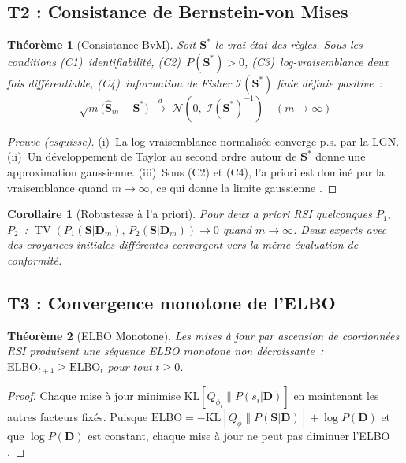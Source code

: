 \documentclass[letterpaper]{article}
\newtheorem{theoreme}{Th\'eor\`eme}
\newtheorem{corollaire}{Corollaire}[theoreme]
\begin{document}
\subsection{T2 : Consistance de Bernstein-von Mises}

\begin{theoreme}[Consistance BvM]
\label{thm:bvm}
Soit $\mathbf{S}^*$ le vrai \'etat des r\`egles. Sous les conditions
(C1)~identifiabilit\'e, (C2)~$P(\mathbf{S}^*) > 0$,
(C3)~log-vraisemblance deux fois diff\'erentiable,
(C4)~information de Fisher $\mathcal{I}(\mathbf{S}^*)$ finie d\'efinie positive~:
\[
  \sqrt{m}\bigl(\hat{\mathbf{S}}_m - \mathbf{S}^*\bigr)
  \;\xrightarrow{d}\;
  \mathcal{N}\!\left(0,\;\mathcal{I}(\mathbf{S}^*)^{-1}\right)
  \quad (m \to \infty)
\]
\end{theoreme}

\begin{proof}[Preuve (esquisse)]
(i)~La log-vraisemblance normalis\'ee converge p.s. par la LGN.
(ii)~Un d\'eveloppement de Taylor au second ordre autour de $\mathbf{S}^*$
donne une approximation gaussienne.
(iii)~Sous (C2) et (C4), l'a priori est domin\'e par la vraisemblance
quand $m \to \infty$, ce qui donne la limite gaussienne
\citep{van2000asymptotic}.
\end{proof}

\begin{corollaire}[Robustesse \`a l'a priori]
Pour deux a priori RSI quelconques $P_1$, $P_2$~:
$\operatorname{TV}(P_1(\mathbf{S}|\mathbf{D}_m),\, P_2(\mathbf{S}|\mathbf{D}_m))
\to 0$ quand $m \to \infty$.
Deux experts avec des croyances initiales diff\'erentes convergent
vers la m\^eme \'evaluation de conformit\'e.
\end{corollaire}

\subsection{T3 : Convergence monotone de l'ELBO}

\begin{theoreme}[ELBO Monotone]
\label{thm:elbo}
Les mises \`a jour par ascension de coordonn\'ees RSI produisent une
s\'equence ELBO monotone non d\'ecroissante~:
$\mathrm{ELBO}_{t+1} \geq \mathrm{ELBO}_t$ pour tout $t \geq 0$.
\end{theoreme}

\begin{proof}
Chaque mise \`a jour minimise $\mathrm{KL}[Q_{\phi_i} \| P(s_i |
\mathbf{D})]$ en maintenant les autres facteurs fix\'es. Puisque
$\mathrm{ELBO} = -\mathrm{KL}[Q_\phi \| P(\mathbf{S}|\mathbf{D})] +
\log P(\mathbf{D})$ et que $\log P(\mathbf{D})$ est constant, chaque
mise \`a jour ne peut pas diminuer l'ELBO \citep{blei2017variational}.
\end{proof}
\end{document}
